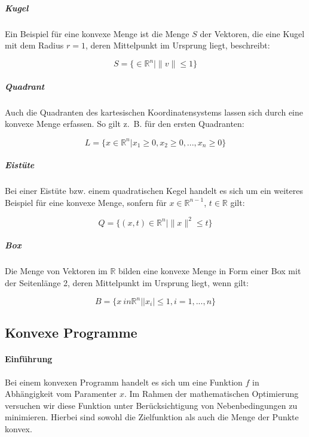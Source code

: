 \subparagraph{Kugel}

Ein Beispiel für eine konvexe Menge ist die Menge $S$ der Vektoren, die eine Kugel mit dem Radius $r = 1$, deren Mittelpunkt im Ursprung liegt, beschreibt:

\begin{equation*}
S = \{ \in \mathbb{R}^{n} | \|v\| \le 1\}
\end{equation*}

\subparagraph{Quadrant}

Auch die Quadranten des kartesischen Koordinatensystems lassen sich durch eine konvexe Menge erfassen. So gilt z.~B. für den ersten Quadranten:

\begin{equation*}
L = \{ x \in \mathbb{R}^{n} | x_1 \ge 0, x_2 \ge 0, ..., x_n \ge 0\}
\end{equation*}

\subparagraph{Eistüte}

Bei einer Eistüte bzw. einem quadratischen Kegel handelt es sich um ein weiteres Beispiel für eine konvexe Menge, sonfern für $x \in \mathbb{R}^{n-1}$, $t \in \mathbb{R}$ gilt:

\begin{equation*}
Q = \{(x, t) \in \mathbb{R}^{n} | \|x\|^{2} \le t\}
\end{equation*}

\subparagraph{Box}

Die Menge von Vektoren im $\mathbb{R}$ bilden eine konvexe Menge in Form einer Box mit der Seitenlänge 2, deren Mittelpunkt im Ursprung liegt, wenn gilt:

\begin{equation*}
B = \{x \ in \mathbb{R}^{n} | |x_{i}| \le 1, i = 1, ..., n\}
\end{equation*}

\subsection{Konvexe Programme}

\paragraph{Einführung}

Bei einem konvexen Programm handelt es sich um eine Funktion $f$ in Abhängigkeit vom Paramenter $x$. Im Rahmen der mathematischen Optimierung versuchen wir diese Funktion unter Berücksichtigung von Nebenbedingungen zu minimieren. Hierbei sind sowohl die Zielfunktion als auch die Menge der Punkte konvex.

